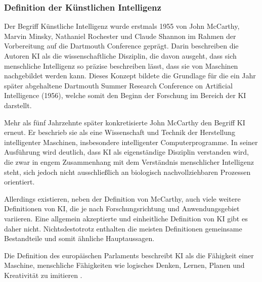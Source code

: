 \subsubsection{Definition der Künstlichen Intelligenz}
Der Begriff \glqq Künstliche Intelligenz\grqq{} wurde erstmals 1955 von John McCarthy, Marvin Minsky, Nathaniel Rochester und Claude Shannon im Rahmen der Vorbereitung auf die Dartmouth Conference geprägt. Darin beschreiben die Autoren \ac{KI} als die wissenschaftliche Disziplin, die davon ausgeht, dass sich menschliche Intelligenz so präzise beschreiben lässt, dass sie von Maschinen nachgebildet werden kann. Dieses Konzept bildete die Grundlage für die ein Jahr später abgehaltene Dartmouth Summer Research Conference on Artificial Intelligence (1956), welche somit den Beginn der Forschung im Bereich der \ac{KI} darstellt. \cite[]{mccarthy_proposal_2006}

Mehr als fünf Jahrzehnte später konkretisierte John McCarthy den Begriff \ac{KI} erneut. Er beschrieb sie als eine Wissenschaft und Technik der Herstellung intelligenter Maschinen, insbesondere intelligenter Computerprogramme. In seiner Ausführung wird deutlich, dass \ac{KI} als eigenständige Disziplin verstanden wird, die zwar in engem Zusammenhang mit dem Verständnis menschlicher Intelligenz steht, sich jedoch nicht ausschließlich an biologisch nachvollziehbaren Prozessen orientiert. \cite[]{mccarthy_what_2007}

Allerdings existieren, neben der Definition von McCarthy, auch viele weitere Definitionen von \ac{KI}, die je nach Forschungsrichtung und Anwendungsgebiet variieren. Eine allgemein akzeptierte und einheitliche Definition von \ac{KI} gibt es daher nicht. Nichtsdestotrotz enthalten die meisten Definitionen gemeinsame Bestandteile und somit ähnliche Hauptaussagen. \cite[]{goudz_grundlagen_2024}

Die Definition des europäischen Parlaments beschreibt \ac{KI} als die \glqq [...] Fähigkeit einer Maschine, menschliche Fähigkeiten wie logisches Denken, Lernen, Planen und Kreativität zu imitieren \grqq{} \cite{noauthor_was_2020}. 

